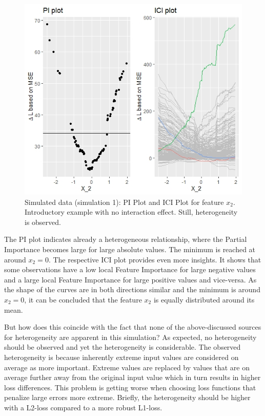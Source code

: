 \documentclass[]{krantz}
\begin{document}
\begin{figure}

{\centering \includegraphics[width=0.99\linewidth]{images/03-7-1} 

}

\caption{Simulated data (simulation 1): PI Plot and ICI Plot for feature $x_{2}$. Introductory example with no interaction effect. Still, heterogeneity is observed.}\label{fig:fig1}
\end{figure}

The PI plot indicates already a heterogeneous relationship, where the
Partial Importance becomes large for large absolute values. The minimum
is reached at around \(x_{2} = 0\). The respective ICI plot provides
even more insights. It shows that some observations have a low local
Feature Importance for large negative values and a large local Feature
Importance for large positive values and vice-versa. As the shape of the
curves are in both directions similar and the minimum is around
\(x_{2} = 0\), it can be concluded that the feature \(x_{2}\) is equally
distributed around its mean.

But how does this coincide with the fact that none of the
above-discussed sources for heterogeneity are apparent in this
simulation? As expected, no heterogeneity should be observed and yet the
heterogeneity is considerable. The observed heterogeneity is because
inherently extreme input values are considered on average as more
important. Extreme values are replaced by values that are on average
further away from the original input value which in turn results in
higher loss differences. This problem is getting worse when choosing
loss functions that penalize large errors more extreme. Briefly, the
heterogeneity should be higher with a L2-loss compared to a more robust
L1-loss.
\end{document}
